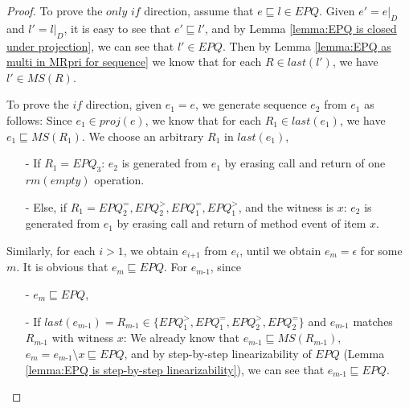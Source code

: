 \begin {proof}

To prove the $\textit{only if}$ direction, assume that $e \sqsubseteq l \in \textit{EPQ}$. Given $e' = e \vert_{D}$ and $l' = l \vert_{D}$, it is easy to see that $e' \sqsubseteq l'$, and by Lemma \ref{lemma:EPQ is closed under projection}, we can see that $l' \in \textit{EPQ}$. Then by Lemma \ref{lemma:EPQ as multi in MRpri for sequence} we know that for each $R \in \textit{last}(l')$, we have $l' \in \textit{MS}(R)$.

To prove the $\textit{if}$ direction, given $e_1 = e$, we generate sequence $e_2$ from $e_1$ as follows: Since $e_1 \in \textit{proj}(e)$, we know that for each $R_1 \in \textit{last}(e_1)$, we have $e_1 \sqsubseteq \textit{MS}(R_1)$. We choose an arbitrary $R_1$ in $\textit{last}(e_1)$,

\begin{itemize}
\setlength{\itemsep}{0.5pt}
\item[-] If $R_1 = \textit{EPQ}_3$: $e_2$ is generated from $e_1$ by erasing call and return of one $\textit{rm}(\textit{empty})$ operation.

\item[-] Else, if $R_1 = \textit{EPQ}_2^{=}, \textit{EPQ}_2^{>}, \textit{EPQ}_1^{=}, \textit{EPQ}_1^{>}$, and the witness is $x$: $e_2$ is generated from $e_1$ by erasing call and return of method event of item $x$.
\end{itemize}

Similarly, for each $i > 1$, we obtain $e_{\textit{i+1}}$ from $e_i$, until we obtain $e_m = \epsilon$ for some $m$. It is obvious that $e_m \sqsubseteq \textit{EPQ}$. For $e_{\textit{m-1}}$, since

\begin{itemize}
\setlength{\itemsep}{0.5pt}
\item[-] $e_m \sqsubseteq \textit{EPQ}$,

\item[-] If $\textit{last}(e_{\textit{m-1}}) = R_{\textit{m-1}} \in \{ \textit{EPQ}_1^{>}, \textit{EPQ}_1^{=}, \textit{EPQ}_2^{>}, \textit{EPQ}_2^{=} \}$ and $e_{\textit{m-1}}$ matches $R_{\textit{m-1}}$ with witness $x$: We already know that $e_{\textit{m-1}} \sqsubseteq \textit{MS}(R_{\textit{m-1}})$, $e_m = e_{\textit{m-1}} \setminus x \sqsubseteq \textit{EPQ}$, and by step-by-step linearizability of $\textit{EPQ}$ (Lemma \ref{lemma:EPQ is step-by-step linearizability}), we can see that $e_{\textit{m-1}} \sqsubseteq \textit{EPQ}$.



\end{itemize}
\end{proof}
